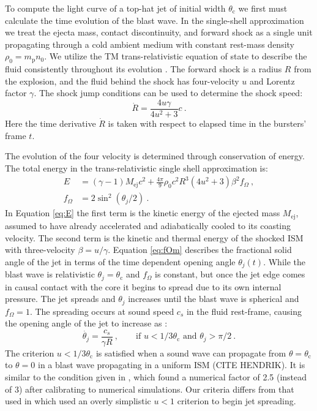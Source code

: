 \documentclass[twocolumn]{aastex62}
\newcommand{\Mej}{\ensuremath{M_{\mathrm{ej}}}}
\newcommand{\thC}{\ensuremath{\theta_{\mathrm{c}}}}
\newcommand{\Mp}{\ensuremath{m_{\mathrm{p}}}}
\begin{document}
To compute the light curve of a top-hat jet of initial width $\thC$ we first must calculate the time evolution of the blast wave. In the single-shell approximation we treat the ejecta mass, contact discontinuity, and forward shock as a single unit propagating through a cold ambient medium with constant rest-mass density $\rho_0 = \Mp n_0$.  We utilize the TM trans-relativistic equation of state to describe the fluid consistently throughout its evolution \citep{Mignone:2005aa}.  The forward shock is a radius $R$ from the explosion, and the fluid behind the shock has four-velocity $u$ and Lorentz factor $\gamma$.  The shock jump conditions can be used to determine the shock speed:
\begin{equation}
	\dot{R} = \frac{4 u \gamma}{4 u^2 +3}c\ . \label{eq:Rdot}
\end{equation}
Here the time derivative $\dot{R}$ is taken with respect to elapsed time in the bursters' frame $t$.  

 The evolution of the four velocity is determined through conservation of energy.  The total energy in the trans-relativistic single shell approximation is:
\begin{align}
	E &= (\gamma - 1)\Mej c^2 + \frac{4\pi}{9} \rho_0 c^2 R^3 (4 u^2 + 3) \beta^2 f_\Omega \ , \label{eq:E} \\
	f_\Omega &= 2 \sin^2\left( \theta_j / 2 \right)\ . \label{eq:fOm}
\end{align}
In Equation \eqref{eq:E} the first term is the kinetic energy of the ejected mass $\Mej$, assumed to have already accelerated and adiabatically cooled to its coasting velocity. The second term is the kinetic and thermal energy of the shocked ISM with three-velocity $\beta = u / \gamma$.  Equation \eqref{eq:fOm} describes the fractional solid angle of the jet in terms of the time dependent opening angle $\theta_j(t)$. While the blast wave is relativistic $\theta_j = \thC$ and $f_\Omega$ is constant, but once the jet edge comes in causal contact with the core it begins to spread due to its own internal pressure. The jet spreads and $\theta_j$ increases until the blast wave is spherical and $f_\Omega=1$.  The spreading occurs at sound speed $c_s$ in the fluid rest-frame, causing the opening angle of the jet to increase as \citep{van-Eerten:2010aa, Duffell:2018aa}:
\begin{equation}
	\dot{\theta_j} = \frac{c_s}{\gamma R}\ , \qquad \text{if } u < 1/3\thC \text{ and } \theta_j > \pi/2\ . \label{eq:thetadot}
\end{equation}
The criterion $u < 1/3\thC$ is satisfied when a sound wave can propagate from $\theta = \thC$ to $\theta=0$ in a blast wave propagating in a uniform ISM (CITE HENDRIK).  It is similar to the condition given in \cite{Duffell:2018aa}, which found a numerical factor of 2.5 (instead of 3) after calibrating to numerical simulations.  Our criteria differs from that used in \citet{Troja:2018aa, Piro:2019aa, van-Eerten:2018aa} which used an overly simplistic $u < 1$ criterion to begin jet spreading.
\end{document}
